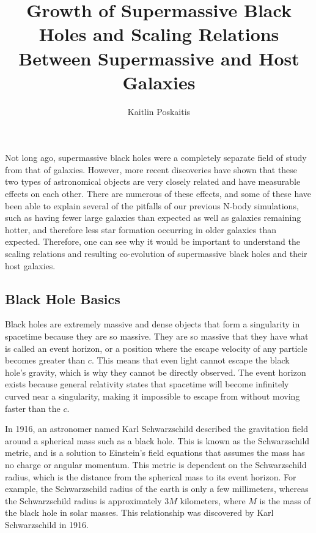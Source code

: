 \documentclass[12pt]{article}
\title{Growth of Supermassive Black Holes and Scaling Relations
              Between Supermassive and Host Galaxies}
\date{}
\author{Kaitlin Poskaitis}
\begin{document}
\clearpage
\maketitle
\thispagestyle{empty}

Not long ago, supermassive black holes were a completely separate field of study
from that of galaxies.  However, more recent discoveries have shown that these
two types of astronomical objects are very closely related and have measurable
effects on each other.  There are numerous of these effects, and some of these
have been able to explain several of the pitfalls of our previous N-body
simulations, such as having fewer large galaxies than expected as well as
galaxies remaining hotter, and therefore less star formation occurring in older
galaxies than expected.  Therefore, one can see why it would be important to
understand the scaling relations and resulting co-evolution of supermassive
black holes and their host galaxies.

\tableofcontents

\pagebreak
\setcounter{page}{1}

\subsection{Black Hole Basics}
Black holes are extremely massive and dense objects that form a singularity in
spacetime
because they are so massive.  They are so massive that they have what is called
an event horizon, or a position where the escape velocity of any particle
becomes greater than $c$.  This means that even light cannot escape the black
hole's gravity, which is why they cannot be directly observed.  The event
horizon exists because general relativity states that spacetime will become
infinitely curved near a singularity, making it impossible to escape from
without moving faster than the $c$.

In 1916, an astronomer named Karl Schwarzschild described the gravitation field
around a spherical mass such as a black hole.  This is known as the
Schwarzschild metric, and is a solution to Einstein's field equations that
assumes the mass has no charge or angular momentum.  This metric is dependent on
the Schwarzschild radius, which is the distance from the spherical mass to its
event horizon.  For example, the Schwarzschild radius of the earth is only a few
millimeters, whereas the Schwarzschild radius is
approximately $3M$ kilometers, where $M$ is the mass of the black hole in solar
masses.  This relationship was discovered by Karl Schwarzschild in 1916.
\end{document}

